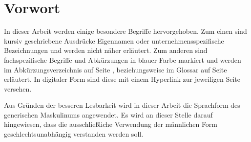 
\pagestyle{empty}

\chapter*{Vorwort}
In dieser Arbeit werden einige besondere Begriffe hervorgehoben. Zum einen sind kursiv geschriebene Ausdrücke Eigennamen oder unternehmensspezifische Bezeichnungen und werden nicht näher erläutert. Zum anderen sind fachspezifische Begriffe und Abkürzungen in blauer Farbe markiert und werden im Abkürzungsverzeichnis auf Seite \pageref{acronyms}, beziehungsweise im Glossar auf Seite \pageref{glossary} erläutert. In digitaler Form sind diese mit einem Hyperlink zur jeweiligen Seite versehen.

Aus  Gründen  der  besseren  Lesbarkeit  wird  in  dieser  Arbeit  die Sprachform des generischen Maskulinums  angewendet. Es wird an dieser Stelle   darauf   hingewiesen,   dass   die   ausschließliche   Verwendung   der männlichen Form geschlechtsunabhängig verstanden werden soll. 